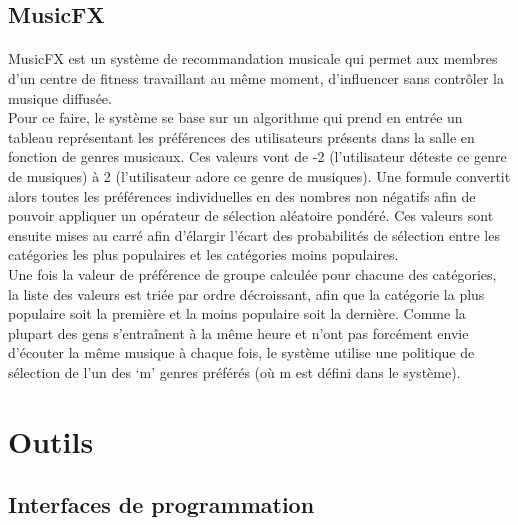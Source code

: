 \documentclass[12pt, openany]{report}
\begin{document}
\subsection{MusicFX}

\paragraph{}MusicFX \cite {MusicFX} est un système de recommandation musicale qui permet aux membres d’un centre de fitness travaillant au même moment, d’influencer sans contrôler la musique diffusée.
\\
Pour ce faire, le système se base sur un algorithme qui prend en entrée un tableau représentant les préférences des utilisateurs présents dans la salle en fonction de genres musicaux. Ces valeurs vont de -2 (l’utilisateur déteste ce genre de musiques) à 2 (l’utilisateur adore ce genre de musiques). Une formule convertit alors toutes les préférences individuelles en des nombres non négatifs afin de pouvoir appliquer un opérateur de sélection aléatoire pondéré. Ces valeurs sont ensuite mises au carré afin d’élargir l’écart des probabilités de sélection entre les catégories les plus populaires et les catégories moins populaires. 
\\
Une fois la valeur de préférence de groupe calculée pour chacune des catégories, la liste des valeurs est triée par ordre décroissant, afin que la catégorie la plus populaire soit la première et la moins populaire soit la dernière. Comme la plupart des gens s’entraînent à la même heure et n’ont pas forcément envie d’écouter la même musique à chaque fois, le système utilise une politique de sélection de l’un des ‘m’ genres préférés (où m est défini dans le système).

\section{Outils}

\subsection{Interfaces de programmation}
\end{document}
